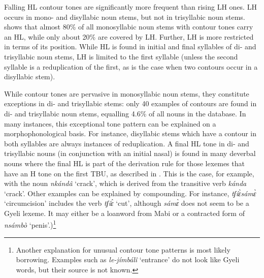 Falling HL contour tones are significantly more frequent than rising LH ones. LH occurs in mono- and disyllabic noun stems, but not in trisyllabic noun stems.  shows that almost 80\% of all monosyllabic noun stems with contour tones carry an HL, while only about 20\% are covered by LH. Further, LH is more restricted in terms of its position. While HL is found in initial and final syllables of di- and trisyllabic noun stems, LH is limited to the first syllable (unless the second syllable is a reduplication of the first, as is the case when two contours occur in a disyllabic stem).

While contour tones are pervasive in monosyllabic noun stems, they constitute exceptions in di- and trisyllabic stems: only 40 examples of contours are found in di- and trisyllabic noun stems, equalling  4.6\% of all nouns in the database. In many instances, this exceptional tone pattern can be explained on a morphophonological basis. For instance, disyllabic stems which have a contour in both syllables are always instances of reduplication. A final HL tone in di- and trisyllabic nouns (in conjunction with an initial nasal) is found in many deverbal nouns where the final HL is part of the derivation rule for those lexemes that have an H tone on the first TBU, as described in . This is the case, for example, with the noun {\itshape nkándâ} `crack', which is derived from the transitive verb {\itshape kánda} `crack'. Other examples can be explained by compounding. For instance, {\itshape tʃíɛ̀sámɛ̀} `circumcision' includes the verb {\itshape tʃíɛ̀} `cut', although {\itshape sámɛ̀} does not seem to be a Gyeli lexeme. It may either be a loanword from Mabi or a contracted form of {\itshape nsámbò} `penis'.)\footnote{Another explanation for unusual contour tone patterns is most likely borrowing. Examples such as {\itshape le-jímbálî} `entrance' do not look like Gyeli words, but their source is not known.} 





